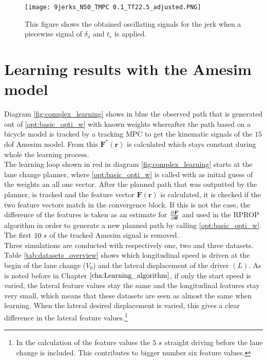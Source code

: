 \begin{figure}[h!]
	\centering
	\texttt{[image: 9jerks\_N50\_TMPC 0.1\_Tf22.5\_adjusted.PNG]}
	\caption{This figure shows the obtained oscillating signals for the jerk when a piecewise signal of $\delta_s$ and $t_r$ is applied.}	
	\label{fig:old_inputs}
\end{figure}

\section{Learning results with the Amesim model}
\label{s:complex_learning_results}
Diagram \ref{fig:complex_learning} shows in blue the observed path that is generated out of \ref{opt:basic_opti_w} with known weights whereafter the path based on a bicycle model is tracked by a tracking MPC to get the kinematic signals of the $15$ dof Amesim model. From this $\bm{F}^*(\bm{r})$ is calculated which stays constant during whole the learning process.\\

The learning loop shown in red in diagram \ref{fig:complex_learning} starts at the lane change planner, where \ref{opt:basic_opti_w} is called with as initial guess of the weights an all one vector. After the planned path that was outputted by the planner, is tracked and the feature vector $\bm{F}(\bm{r})$ is calculated, it is checked if the two feature vectors match in the convergence block. If this is not the case, the difference of the features is taken as an estimate for $\pdv{\bm{F}}{\bm{\theta}}$ and used in the RPROP algorithm in order to generate a new planned path by calling \ref{opt:basic_opti_w}. The first $10 \hspace{1mm}s$ of the tracked Amesim signal is removed.\\
Three simulations are conducted with respectively one, two and three datasets. Table \ref{tab:datasets_overview} shows which longitudinal speed is driven at the begin of the lane change ($V_{0}$) and the lateral displacement of the driver $(L)$. As is noted before in Chapter $\ref{cha:Learning_algorithm}$, if only the start speed is varied, the lateral feature values stay the same and the longitudinal features stay very small, which means that these datasets are seen as almost the same when learning. When the lateral desired displacement is varied, this gives a clear difference in the lateral feature values.\footnote{In the calculation of the feature values the $5 \hspace{1mm}s$ straight driving before the lane change is included. This contributes to bigger number six feature values.} 



